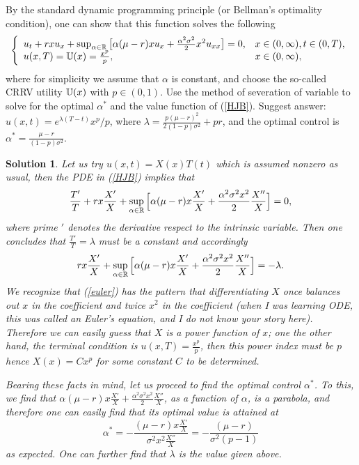 \documentclass[6pt]{article}
\newtheorem{solution}{Solution}
\numberwithin{equation}{section}
\def\mathbb{\Bbb}
\begin{document}
\begin{enumerate}
   By the standard dynamic programming principle (or Bellman's optimality condition), one can show that this function solves the following
    \begin{equation}\label{HJB}
\left\{
\begin{array}{ll}
u_t+rxu_x+\sup_{\alpha\in\mathbb R}\big[\alpha(\mu-r)xu_x+\frac{\alpha^2\sigma^2}{2}x^2u_{xx}\big]=0,&x\in (0,\infty),t\in(0,T),\\
u(x,T)=\mathbb U(x)=\frac{x^p}{p},&x\in (0,\infty),
\end{array}
\right.
\end{equation}
where for simplicity we assume that $\alpha$ is constant, and choose the so-called CRRV utility $\mathbb U(x)$ with $p\in(0,1)$.  Use the method of severation of variable to solve for the optimal $\alpha^*$ and the value function of (\ref{HJB}).  Suggest answer: $u(x,t)=e^{\lambda(T-t)}x^p/p$, where $\lambda=\frac{p(\mu-r)^2}{2(1-p)\sigma^2}+pr$, and the optimal control is $\alpha^*=\frac{\mu-r}{(1-p)\sigma^2}$.
\begin{solution}
Let us try $u(x,t)=X(x)T(t)$ which is assumed nonzero as usual, then the PDE in (\ref{HJB}) implies that
\[\frac{T'}{T}+rx\frac{X'}{X}+\sup_{\alpha\in\mathbb R}\Big[\alpha(\mu-r)x\frac{X'}{X}+\frac{\alpha^2\sigma^2x^2}{2}\frac{X''}{X}\Big]=0,\]
where prime $'$ denotes the derivative respect to the intrinsic variable.  Then one concludes that $\frac{T'}{T}=\lambda$ must be a constant and accordingly
\begin{equation}\label{euler}
rx\frac{X'}{X}+\sup_{\alpha\in\mathbb R}\Big[\alpha(\mu-r)x\frac{X'}{X}+\frac{\alpha^2\sigma^2x^2}{2}\frac{X''}{X}\Big]=-\lambda.
\end{equation}
We recognize that (\ref{euler}) has the pattern that differentiating $X$ once balances out $x$ in the coefficient and twice $x^2$ in the coefficient (when I was learning ODE, this was called an Euler's equation, and I do not know your story here).  Therefore we can easily guess that $X$ is a power function of $x$; one the other hand, the terminal condition is $u(x,T)=\frac{x^p}{p}$, then this power index must be $p$ hence $X(x)=Cx^p$ for some constant $C$ to be determined.

Bearing these facts in mind, let us proceed to find the optimal control $\alpha^*$.  To this, we find that $\alpha(\mu-r)x\frac{X'}{X}+\frac{\alpha^2\sigma^2x^2}{2}\frac{X''}{X}$, as a function of $\alpha$, is a parabola, and therefore one can easily find that its optimal value is attained at
\[\alpha^*=-\frac{(\mu-r)x\frac{X'}{X}}{\sigma^2x^2\frac{X''}{X}}=-\frac{(\mu-r)}{\sigma^2(p-1)}\]
as expected.  One can further find that $\lambda$ is the value given above.


\end{solution}
\end{enumerate}
\end{document}

